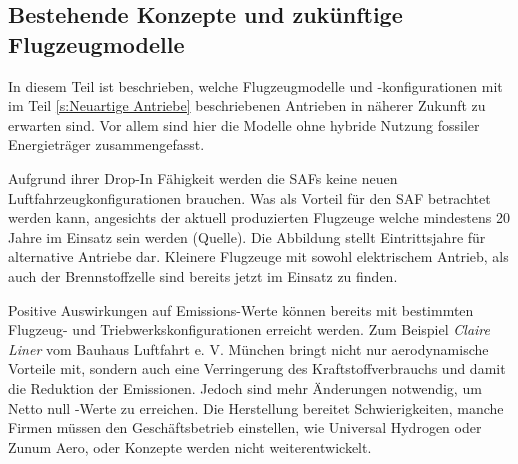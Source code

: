 \subsection{Bestehende Konzepte und zukünftige Flugzeugmodelle}
In diesem Teil ist beschrieben, welche Flugzeugmodelle und -konfigurationen 
mit im Teil \ref{s:Neuartige Antriebe} beschriebenen Antrieben in näherer Zukunft zu erwarten sind. 
Vor allem sind hier die Modelle ohne hybride Nutzung fossiler Energieträger zusammengefasst.

Aufgrund ihrer Drop-In Fähigkeit werden die SAFs keine neuen Luftfahrzeugkonfigurationen brauchen. 
Was als Vorteil für den SAF betrachtet werden kann, 
angesichts der aktuell produzierten Flugzeuge welche
mindestens 20 Jahre im Einsatz sein werden (Quelle).  %
Die Abbildung stellt Eintrittsjahre für alternative Antriebe dar. %
Kleinere Flugzeuge mit sowohl elektrischem Antrieb, als auch der Brennstoffzelle sind bereits jetzt im Einsatz zu finden.

%
Positive Auswirkungen auf Emissions-Werte können bereits mit bestimmten 
Flugzeug- und Triebwerkskonfigurationen erreicht werden.
Zum Beispiel \textit{Claire Liner} vom Bauhaus Luftfahrt e. V. München 
bringt nicht nur aerodynamische Vorteile mit, sondern auch eine Verringerung 
des Kraftstoffverbrauchs und damit die Reduktion der Emissionen.
Jedoch sind mehr Änderungen notwendig, um Netto null -Werte zu erreichen.
Die Herstellung bereitet Schwierigkeiten, manche Firmen müssen den Geschäftsbetrieb einstellen, 
wie Universal Hydrogen oder Zunum Aero, oder Konzepte werden nicht weiterentwickelt.

